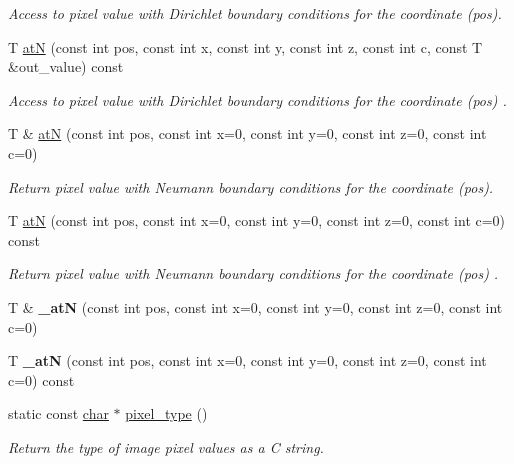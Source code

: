 \begin{DoxyCompactItemize}
\begin{DoxyCompactList}\small\item\em Access to pixel value with Dirichlet boundary conditions for the coordinate ({\ttfamily pos}). \end{DoxyCompactList}\item 
\mbox{\label{structcimg__library__suffixed_1_1CImgList_a74ed53fc8d338abde583b83e7a36b262}} 
T \hyperlink{structcimg__library__suffixed_1_1CImgList_a74ed53fc8d338abde583b83e7a36b262}{atN} (const int pos, const int x, const int y, const int z, const int c, const T \&out\+\_\+value) const
\begin{DoxyCompactList}\small\item\em Access to pixel value with Dirichlet boundary conditions for the coordinate ({\ttfamily pos}) . \end{DoxyCompactList}\item 
T \& \hyperlink{structcimg__library__suffixed_1_1CImgList_ae166f00e603397281ffa534418137a8a}{atN} (const int pos, const int x=0, const int y=0, const int z=0, const int c=0)
\begin{DoxyCompactList}\small\item\em Return pixel value with Neumann boundary conditions for the coordinate ({\ttfamily pos}). \end{DoxyCompactList}\item 
\mbox{\label{structcimg__library__suffixed_1_1CImgList_aa4582330c3621397ce037df886813823}} 
T \hyperlink{structcimg__library__suffixed_1_1CImgList_aa4582330c3621397ce037df886813823}{atN} (const int pos, const int x=0, const int y=0, const int z=0, const int c=0) const
\begin{DoxyCompactList}\small\item\em Return pixel value with Neumann boundary conditions for the coordinate ({\ttfamily pos}) . \end{DoxyCompactList}\item 
\mbox{\label{structcimg__library__suffixed_1_1CImgList_abe90c94edd8c5ebddf6074d9a31d4961}} 
T \& {\bfseries \+\_\+atN} (const int pos, const int x=0, const int y=0, const int z=0, const int c=0)
\item 
\mbox{\label{structcimg__library__suffixed_1_1CImgList_a083a199a35544e8e233c945f558ee51d}} 
T {\bfseries \+\_\+atN} (const int pos, const int x=0, const int y=0, const int z=0, const int c=0) const
\item 
static const \hyperlink{classchar}{char} $\ast$ \hyperlink{structcimg__library__suffixed_1_1CImgList_a55a11e1b7827dac9e38f29e1c4cfb3ec}{pixel\+\_\+type} ()
\begin{DoxyCompactList}\small\item\em Return the type of image pixel values as a C string. \end{DoxyCompactList}\end{DoxyCompactItemize}
